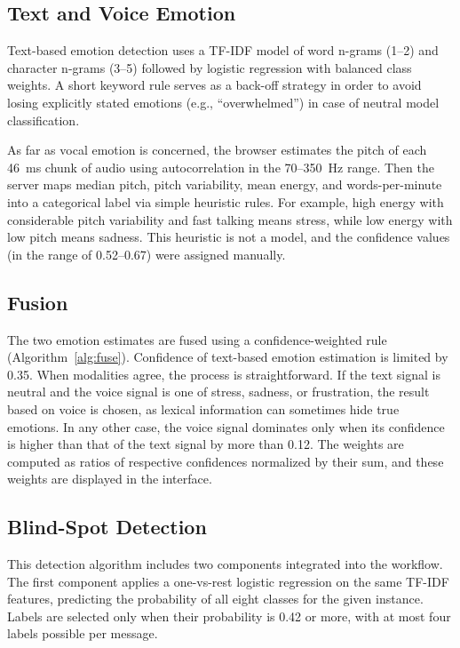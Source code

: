 \documentclass[conference]{IEEEtran}
\begin{document}
\subsection{Text and Voice Emotion}
Text-based emotion detection uses a TF-IDF model of word n-grams (1--2) and character n-grams (3--5) followed by logistic regression with balanced class weights. A short keyword rule serves as a back-off strategy in order to avoid losing explicitly stated emotions (e.g., ``overwhelmed'') in case of neutral model classification.

As far as vocal emotion is concerned, the browser estimates the pitch of each 46~ms chunk of audio using autocorrelation in the 70--350~Hz range. Then the server maps median pitch, pitch variability, mean energy, and words-per-minute into a categorical label via simple heuristic rules. For example, high energy with considerable pitch variability and fast talking means stress, while low energy with low pitch means sadness. This heuristic is not a model, and the confidence values (in the range of 0.52--0.67) were assigned manually.

\subsection{Fusion}
The two emotion estimates are fused using a confidence-weighted rule (Algorithm~\ref{alg:fuse}). Confidence of text-based emotion estimation is limited by 0.35. When modalities agree, the process is straightforward. If the text signal is neutral and the voice signal is one of stress, sadness, or frustration, the result based on voice is chosen, as lexical information can sometimes hide true emotions. In any other case, the voice signal dominates only when its confidence is higher than that of the text signal by more than 0.12. The weights are computed as ratios of respective confidences normalized by their sum, and these weights are displayed in the interface.

\subsection{Blind-Spot Detection}
This detection algorithm includes two components integrated into the workflow. The first component applies a one-vs-rest logistic regression on the same TF-IDF features, predicting the probability of all eight classes for the given instance. Labels are selected only when their probability is 0.42 or more, with at most four labels possible per message.
\end{document}
